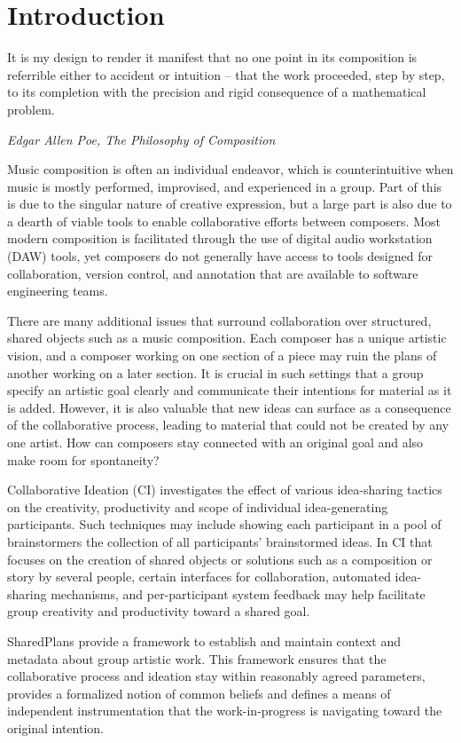 \documentclass[final,authoryear,5p,times,twocolumn]{elsarticle}
\begin{document}
\section*{Introduction}
\label{sec:introduction}

\epigraph{It is my design to render it manifest that no one point in its composition is referrible either to accident or intuition -- that the work proceeded, step by step, to its completion with the precision and rigid consequence of a mathematical problem.}{\textit{Edgar Allen Poe, The Philosophy of Composition}}

Music composition is often an individual endeavor, which is counterintuitive when music is mostly performed, improvised, and experienced in a group. Part of this is due to the singular nature of creative expression, but a large part is also due to a dearth of viable tools to enable collaborative efforts between composers. Most modern composition is facilitated through the use of digital audio workstation (DAW) tools, yet composers do not generally have access to tools designed for collaboration, version control, and annotation that are available to software engineering teams.

There are many additional issues that surround collaboration over structured, shared objects such as a music composition. Each composer has a unique artistic vision, and a composer working on one section of a piece may ruin the plans of another working on a later section. It is crucial in such settings that a group specify an artistic goal clearly and communicate their intentions for material as it is added. However, it is also valuable that new ideas can surface as a consequence of the collaborative process, leading to material that could not be created by any one artist. How can composers stay connected with an original goal and also make room for spontaneity?

Collaborative Ideation (CI) investigates the effect of various idea-sharing tactics on the creativity, productivity and scope of individual idea-generating participants. Such techniques may include showing each participant in a pool of brainstormers the collection of all participants' brainstormed ideas. In CI that focuses on the creation of shared objects or solutions such as a composition or story by several people, certain interfaces for collaboration, automated idea-sharing mechanisms, and per-participant system feedback may help facilitate group creativity and productivity toward a shared goal.

SharedPlans provide a framework to establish and maintain context and metadata about group artistic work. This framework ensures that the collaborative process and ideation stay within reasonably agreed parameters, provides a formalized notion of common beliefs and defines a means of independent instrumentation that the work-in-progress is navigating toward the original intention.
\end{document}

